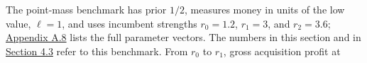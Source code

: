 The point-mass benchmark has prior \(1/2\), measures money in units of
the low value, \(\ell=1\), and uses incumbent strengths \(r_0=1.2\),
\(r_1=3\), and \(r_2=3.6\); \hyperref[pa-parameters]{Appendix A.8} lists
the full parameter vectors. The numbers in this section and in
\hyperref[sec-coexistence-and-the-equilibrium-correspondence]{Section 4.3}
refer to this benchmark. From \(r_0\) to \(r_1\), gross acquisition profit at
